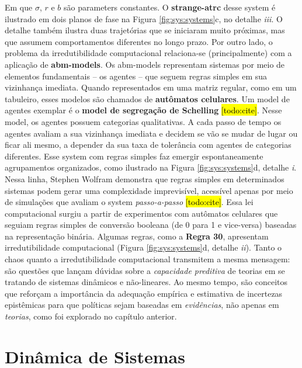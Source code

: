 \documentclass[./main.tex]{subfiles}
\begin{document}
Em que $\sigma$, $r$ e $b$ são \gls{parameters} constantes. O \textbf{\gls{strange-atrc}} desse \gls{system} é ilustrado em dois planos de fase na Figura \ref{fig:sys:systems}c, no detalhe \textrm{\textit{iii}}. O detalhe também ilustra duas trajetórias que se iniciaram muito próximas, mas que assumem comportamentos diferentes no longo prazo. Por outro lado, o problema da irredutibilidade computacional relaciona-se (principalmente) com a aplicação de \textbf{\gls{abm-models}}. Os \gls{abm-models} representam sistemas por meio de elementos fundamentais – os agentes – que seguem regras simples em sua vizinhança imediata. Quando representados em uma matriz regular, como em um tabuleiro, esses modelos são chamados de \textbf{autômatos celulares}. Um \gls{model} de agentes exemplar é o \textbf{\gls{model} de segregação de Schelling} \hl{[todo:cite]}. Nesse \gls{model}, os agentes possuem categorias qualitativas. A cada passo de tempo os agentes avaliam a sua vizinhança imediata e decidem se vão se mudar de lugar ou ficar ali mesmo, a depender da sua taxa de tolerância com agentes de categorias diferentes. Esse \gls{system} com regras simples faz emergir espontaneamente agrupamentos organizados, como ilustrado na Figura \ref{fig:sys:systems}d, detalhe \textrm{\textit{i}}. Nessa linha, Stephen Wolfram demonstra que regras simples em determinados sistemas podem gerar uma complexidade imprevisível, acessível apenas por meio de simulações que avaliam o \gls{system} \textit{passo-a-passo} \hl{[todo:cite]}. Essa lei computacional surgiu a partir de experimentos com autômatos celulares que seguiam regras simples de conversão booleana (de 0 para 1 e vice-versa) baseadas na representação binária. Algumas regras, como a \textbf{Regra 30}, apresentam irredutibilidade computacional (Figura \ref{fig:sys:systems}d, detalhe \textrm{\textit{ii}}). Tanto o \gls{chaos} quanto a irredutibilidade computacional transmitem a mesma mensagem: são questões que lançam dúvidas sobre a \textit{capacidade preditiva} de teorias em se tratando de sistemas dinâmicos e não-lineares. Ao mesmo tempo, são conceitos que reforçam a importância da adequação empírica e estimativa de incertezas epistêmicas para que políticas sejam baseadas em \textit{evidências}, não apenas em \textit{teorias}, como foi explorado no capítulo anterior.

\section{Dinâmica de Sistemas} \label{sec:sys:dynamics}
\end{document}
